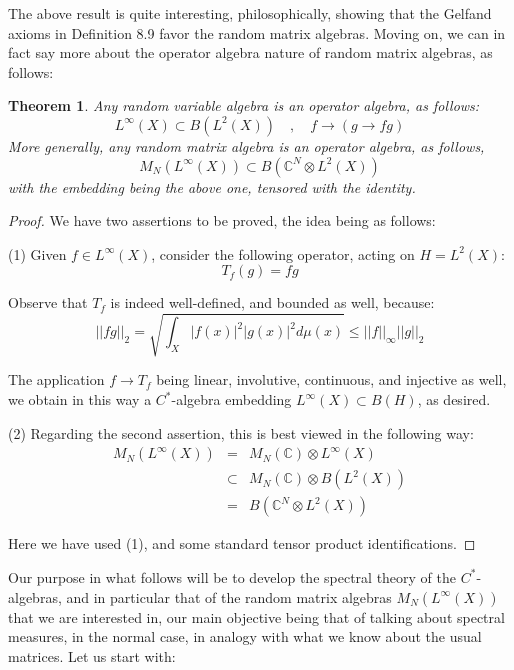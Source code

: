 \documentclass[12pt]{amsbook}
\newtheorem{theorem}{Theorem}[chapter]
\begin{document}
The above result is quite interesting, philosophically, showing that the Gelfand axioms in Definition 8.9 favor the random matrix algebras. Moving on, we can in fact say more about the operator algebra nature of random matrix algebras, as follows:

\begin{theorem}
Any random variable algebra is an operator algebra, as follows:
$$L^\infty(X)\subset B(L^2(X))\quad,\quad 
f\to(g\to fg)$$
More generally, any random matrix algebra is an operator algebra, as follows,
$$M_N(L^\infty(X))\subset B\left(\mathbb C^N\otimes L^2(X)\right)$$
with the embedding being the above one, tensored with the identity.
\end{theorem}

\begin{proof}
We have two assertions to be proved, the idea being as follows:

\medskip

(1) Given $f\in L^\infty(X)$, consider the following operator, acting on $H=L^2(X)$:
$$T_f(g)=fg$$

Observe that $T_f$ is indeed well-defined, and bounded as well, because:
$$||fg||_2
=\sqrt{\int_X|f(x)|^2|g(x)|^2d\mu(x)}
\leq||f||_\infty||g||_2$$

The application $f\to T_f$ being linear, involutive, continuous, and injective as well, we obtain in this way a $C^*$-algebra embedding $L^\infty(X)\subset B(H)$, as desired.

\medskip

(2) Regarding the second assertion, this is best viewed in the following way:
\begin{eqnarray*}
M_N(L^\infty(X))
&=&M_N(\mathbb C)\otimes L^\infty(X)\\
&\subset&M_N(\mathbb C)\otimes B(L^2(X))\\
&=&B\left(\mathbb C^N\otimes L^2(X)\right)
\end{eqnarray*}

Here we have used (1), and some standard tensor product identifications.
\end{proof}

Our purpose in what follows will be to develop the spectral theory of the $C^*$-algebras, and in particular that of the random matrix algebras $M_N(L^\infty(X))$ that we are interested in, our main objective being that of talking about spectral measures, in the normal case, in analogy with what we know about the usual matrices. Let us start with:

\end{document}
